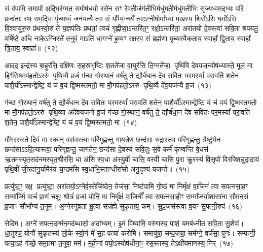 सं व॑पामि॒ समापो॑ अ॒द्भिर॑ग्मत॒ समोष॑धयो॒ रसे॑न॒ सꣳ रे॒वती॒र्जग॑तीभि॒र्मधु॑मती॒र्मधु॑मतीभिः सृज्यध्वम॒द्भ्यः परि॒ प्रजा॑ताः स्थ॒ सम॒द्भिः पृ॑च्यध्वं॒ जन॑यत्यै त्वा॒ सं यौ᳚म्य॒ग्नये᳚ त्वा॒\-ऽग्नी\-षोमा᳚भ्यां म॒खस्य॒ शिरो॑\-ऽसि घ॒र्मो॑\-ऽसि वि॒श्वायु॑रु॒रु प्र॑थस्वो॒रु ते॑ य॒ज्ञप॑तिः प्रथतां॒ त्वचं॑ गृह्णीष्वा॒\-ऽन्तरि॑त॒ꣳ॒ रक्षो॒\-ऽन्तरि॑ता॒ अरा॑तयो दे॒वस्त्वा॑ सवि॒ता श्र॑पयतु॒ वर्\mbox{}षि॑ष्ठे॒ अधि॒ नाके॒\-ऽग्निस्ते॑ त॒नुवं॒ मा\-ऽति॑ धा॒गग्ने॑ ह॒व्यꣳ र॑क्षस्व॒ सं ब्रह्म॑णा पृच्यस्वैक॒ताय॒ स्वाहा᳚ द्वि॒ताय॒ स्वाहा᳚ त्रि॒ताय॒ स्वाहा᳚॥~(१२)

{\anuvakamend[{स॒वि॒ता द्वाविꣳ॑शतिश्च}]}

आद॑द॒ इन्द्र॑स्य बा॒हुर॑सि॒ दक्षि॑णः स॒हस्र॑भृष्टिः श॒तते॑जा वा॒युर॑सि ति॒ग्मते॑जा॒ पृथि॑वि देवयज॒न्योष॑ध्यास्ते॒ मूलं॒ मा हिꣳ॑सिष॒मप॑हतो॒\-ऽररु॑ पृथि॒व्यै व्र॒जं ग॑च्छ गो॒स्थानं॒ वर्\mbox{}ष॑तु ते॒ द्यौर्ब॑धा॒न दे॑व सवितः पर॒मस्यां᳚ परा॒वति॑ श॒तेन॒ पाशै॒र्यो᳚\-ऽस्मान्द्वेष्टि॒ यं च॑ व॒यं द्वि॒ष्मस्तमतो॒ मा मौ॒गप॑हतो॒\-ऽररु॑ पृथि॒व्यै दे॑व॒यज॑न्यै व्र॒जं~(१३)

ग॑च्छ गो॒स्थानं॒ वर्\mbox{}ष॑तु ते॒ द्यौर्ब॑धा॒न दे॑व सवितः पर॒मस्यां᳚ परा॒वति॑ श॒तेन॒ पाशै॒र्यो᳚\-ऽस्मान्द्वेष्टि॒ यं च॑ व॒यं द्वि॒ष्मस्तमतो॒ मा मौ॒गप॑हतो॒\-ऽररु॑ पृथि॒व्या अदे॑वयजनो व्र॒जं ग॑च्छ गो॒स्थानं॒ वर्\mbox{}ष॑तु ते॒ द्यौर्ब॑धा॒न दे॑व सवितः पर॒मस्यां᳚ परा॒वति॑ श॒तेन॒ पाशै॒र्यो᳚\-ऽस्मान्द्वेष्टि॒ यं च॑ व॒यं द्वि॒ष्मस्तमतो॒ मा~(१४)

मौ॑ग॒ररु॑स्ते॒ दिवं॒ मा स्का॒न्॒ वस॑वस्त्वा॒ परि॑गृह्णन्तु गाय॒त्रेण॒ छन्द॑सा रु॒द्रास्त्वा॒ परि॑गृह्णन्तु॒ त्रैष्टु॑भेन॒ छन्द॑सा\-ऽ\-ऽदि॒त्यास्त्वा॒ परि॑गृह्णन्तु॒ जाग॑तेन॒ छन्द॑सा दे॒वस्य॑ सवि॒तुः स॒वे कर्म॑ कृण्वन्ति वे॒धस॑ ऋ॒तम॑स्यृत॒सद॑नमस्यृत॒श्रीर॑सि॒ धा अ॑सि स्व॒धा अ॑स्यु॒र्वी चासि॒ वस्वी॑ चासि पु॒रा क्रू॒रस्य॑ वि॒सृपो॑ विरफ्शिन्नुदा॒दाय॑ पृथि॒वीं जी॒रदा॑नु॒र्यामैर॑यं च॒न्द्रम॑सि स्व॒धाभि॒स्तान्धीरा॑सो अनु॒दृश्य॑ यजन्ते॥~(१५)

{\anuvakamend[{दे॒व॒यज॑न्यै व्र॒जन्तमतो॒ मा वि॑रफ्शि॒न्नेका॑\-दश च}]}

प्रत्यु॑ष्ट॒ꣳ॒ रक्ष॒ प्रत्यु॑ष्टा॒ अरा॑तयो॒\-ऽग्नेर्व॒स्तेजि॑ष्ठेन॒ तेज॑सा॒ निष्ट॑पामि गो॒ष्ठं मा निर्मृ॑क्षं वा॒जिनं॑ त्वा सपत्नसा॒हꣳ सम्मा᳚र्ज्मि॒ वाचं॑ प्रा॒णं चक्षुः॒ श्रोत्रं॑ प्र॒जां योनिं॒ मा निर्मृ॑क्षं वा॒जिनीं᳚ त्वा सपत्नसा॒हीꣳ सम्मा᳚र्ज्म्या॒शासा॑ना सौमन॒सं प्र॒जाꣳ सौभा᳚ग्यं त॒नूम्। अ॒ग्नेरनु॑व्रता भू॒त्वा सन्न॑ह्ये सुकृ॒ताय॒ कम्। सु॒प्र॒जस॑स्त्वा व॒यꣳ सु॒पत्नी॒रुप॑~(१६)

सेदिम। अग्ने॑ सपत्न॒दम्भ॑न॒मद॑ब्धासो॒ अदा᳚भ्यम्। इ॒मं विष्या॑मि॒ वरु॑णस्य॒ पाशं॒ यमब॑ध्नीत सवि॒ता सु॒शेवः॑। धा॒तुश्च॒ योनौ॑ सुकृ॒तस्य॑ लो॒के स्यो॒नं मे॑ स॒ह पत्या॑ करोमि। समायु॑षा॒ सम्प्र॒जया॒ सम॑ग्ने॒ वर्च॑सा॒ पुनः॑। सम्पत्नी॒ पत्या॒\-ऽहं ग॑च्छे॒ समा॒त्मा त॒नुवा॒ मम॑। म॒ही॒नां पयो॒\-ऽस्योष॑धीना॒ꣳ॒ रस॒स्तस्य॒ ते\-ऽक्षी॑यमाणस्य॒ निर्~(१७)

